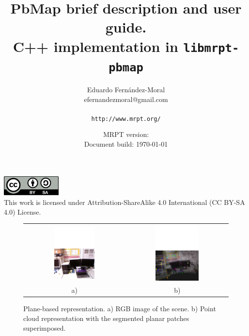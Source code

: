 \documentclass[a4paper,11pt]{article}
\title{PbMap brief description and user guide.\\C++ implementation in \texttt{libmrpt-pbmap}}
\author{Eduardo Fern\'andez-Moral \\ efernandezmoral@gmail.com \\
\\
\texttt{http://www.mrpt.org/} }
\date{MRPT version: \MRPTVERSION \\ Document build: \today }
\begin{document}
\maketitle


\vfill

\begin{scriptsize}
\begin{center}
\includegraphics[width=3cm]{../srba-guide/imgs/by-sa.pdf}
\\
This work is licensed under Attribution-ShareAlike 4.0 International (CC BY-SA 4.0) License.
\end{center}
\end{scriptsize}


\newpage
\tableofcontents
\newpage

\begin{figure}[t!]
    \begin{center}
    \begin{tabular}{cc}
		\includegraphics[width=0.42\textwidth]{imgs/scene.pdf} & \includegraphics[width=0.45\textwidth]{imgs/pbmap.pdf} \\
		\scriptsize a) & \scriptsize b) \\
    \end{tabular}
    \end{center}
    \caption{Plane-based representation. a) RGB image of the scene. b) Point cloud representation with the segmented planar patches superimposed.}
	\label{fig:pbmap}
\end{figure}
\end{document}
